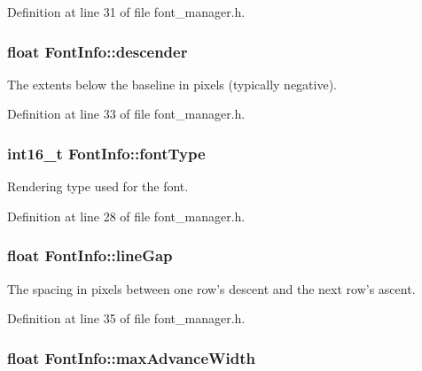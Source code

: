 Definition at line 31 of file font\+\_\+manager.\+h.

\hypertarget{struct_font_info_a9222af5ae7aee891a317ef38a4126d5b}{
\subsubsection[{descender}]{\setlength{\rightskip}{0pt plus 5cm}float Font\+Info\+::descender}}\label{struct_font_info_a9222af5ae7aee891a317ef38a4126d5b}


The extents below the baseline in pixels (typically negative). 



Definition at line 33 of file font\+\_\+manager.\+h.

\hypertarget{struct_font_info_a81891cdae4776065b7c4e3ff2160825e}{
\subsubsection[{font\+Type}]{\setlength{\rightskip}{0pt plus 5cm}int16\+\_\+t Font\+Info\+::font\+Type}}\label{struct_font_info_a81891cdae4776065b7c4e3ff2160825e}


Rendering type used for the font. 



Definition at line 28 of file font\+\_\+manager.\+h.

\hypertarget{struct_font_info_a4395a1361246d87241ff19ecb7009dc9}{
\subsubsection[{line\+Gap}]{\setlength{\rightskip}{0pt plus 5cm}float Font\+Info\+::line\+Gap}}\label{struct_font_info_a4395a1361246d87241ff19ecb7009dc9}


The spacing in pixels between one row's descent and the next row's ascent. 



Definition at line 35 of file font\+\_\+manager.\+h.

\hypertarget{struct_font_info_a060968f05f5ae7795a0f8ca2e6fb15c2}{
\subsubsection[{max\+Advance\+Width}]{\setlength{\rightskip}{0pt plus 5cm}float Font\+Info\+::max\+Advance\+Width}}\label{struct_font_info_a060968f05f5ae7795a0f8ca2e6fb15c2}


